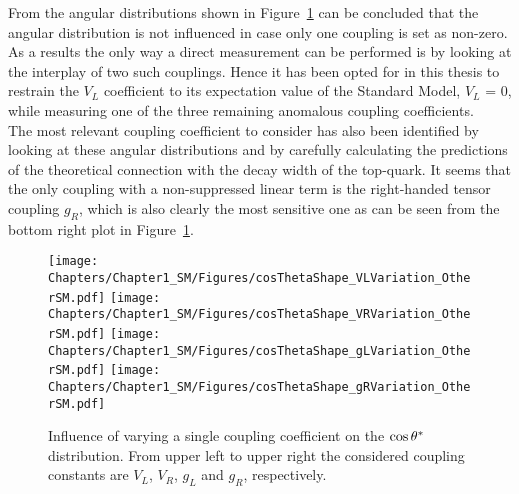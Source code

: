 From the angular distributions shown in Figure~\ref{fig::CsThInfluence} can be concluded that the angular distribution is not influenced in case only one coupling is set as non-zero.
As a results the only way a direct measurement can be performed is by looking at the interplay of two such couplings. Hence it has been opted for in this thesis to restrain the $V_L$ coefficient to its expectation value of the Standard Model, $V_L$ = 0, while measuring one of the three remaining anomalous coupling coefficients.
\\
The most relevant coupling coefficient to consider has also been identified by looking at these angular distributions and by carefully calculating the predictions of the theoretical connection with the decay width of the top-quark.
It seems that the only coupling with a non-suppressed linear term is the right-handed tensor coupling $g_R$, which is also clearly the most sensitive one as can be seen from the bottom right plot in Figure~\ref{fig::CsThInfluence}.
\begin{figure}[h!t]
 \centering
 \texttt{[image: Chapters/Chapter1\_SM/Figures/cosThetaShape\_VLVariation\_OtherSM.pdf]}
 \texttt{[image: Chapters/Chapter1\_SM/Figures/cosThetaShape\_VRVariation\_OtherSM.pdf]}
 \texttt{[image: Chapters/Chapter1\_SM/Figures/cosThetaShape\_gLVariation\_OtherSM.pdf]}
 \texttt{[image: Chapters/Chapter1\_SM/Figures/cosThetaShape\_gRVariation\_OtherSM.pdf]}
 \caption{Influence of varying a single coupling coefficient on the $\cos \theta^{*}$ distribution. From upper left to upper right the considered coupling constants are $V_L$, $V_R$, $g_L$ and $g_R$, respectively.}
 \label{fig::CsThInfluence}
\end{figure}

